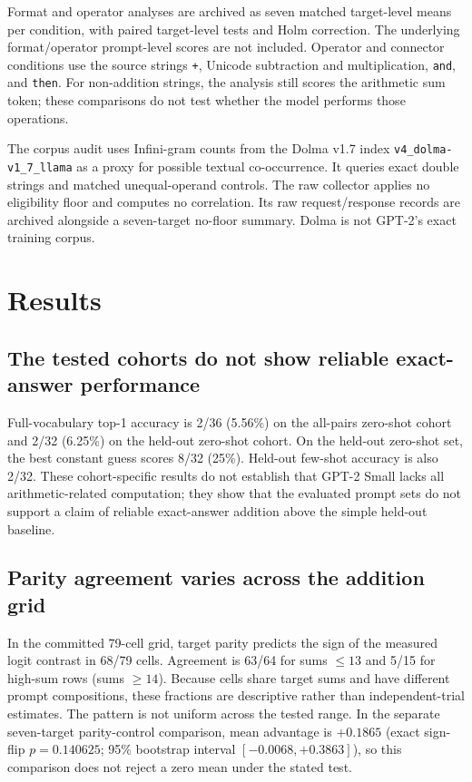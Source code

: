 \documentclass[11pt]{article}
\begin{document}
Format and operator analyses are archived as seven matched target-level means per condition, with paired target-level tests and Holm correction. The underlying format/operator prompt-level scores are not included. Operator and connector conditions use the source strings \texttt{+}, Unicode subtraction and multiplication, \texttt{and}, and \texttt{then}. For non-addition strings, the analysis still scores the arithmetic sum token; these comparisons do not test whether the model performs those operations.

The corpus audit uses Infini-gram counts from the Dolma v1.7 index \texttt{v4\_dolma-v1\_7\_llama} as a proxy for possible textual co-occurrence. It queries exact double strings and matched unequal-operand controls. The raw collector applies no eligibility floor and computes no correlation. Its raw request/response records are archived alongside a seven-target no-floor summary. Dolma is not GPT-2's exact training corpus.

\section{Results}

\subsection{The tested cohorts do not show reliable exact-answer performance}

Full-vocabulary top-1 accuracy is 2/36 (5.56\%) on the all-pairs zero-shot cohort and 2/32 (6.25\%) on the held-out zero-shot cohort. On the held-out zero-shot set, the best constant guess scores 8/32 (25\%). Held-out few-shot accuracy is also 2/32. These cohort-specific results do not establish that GPT-2 Small lacks all arithmetic-related computation; they show that the evaluated prompt sets do not support a claim of reliable exact-answer addition above the simple held-out baseline.

\subsection{Parity agreement varies across the addition grid}

In the committed 79-cell grid, target parity predicts the sign of the measured logit contrast in 68/79 cells. Agreement is 63/64 for sums $\leq 13$ and 5/15 for high-sum rows (sums $\geq 14$). Because cells share target sums and have different prompt compositions, these fractions are descriptive rather than independent-trial estimates. The pattern is not uniform across the tested range. In the separate seven-target parity-control comparison, mean advantage is $+0.1865$ (exact sign-flip $p=0.140625$; 95\% bootstrap interval $[-0.0068,+0.3863]$), so this comparison does not reject a zero mean under the stated test.
\end{document}
